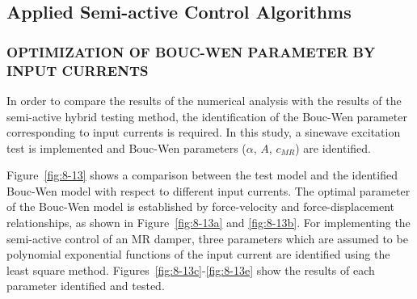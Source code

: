 \subsection{Applied Semi-active Control Algorithms}
\subsubsection{OPTIMIZATION OF BOUC-WEN PARAMETER BY INPUT CURRENTS}

In order to compare the results of the numerical analysis with the results of the semi-active hybrid testing method, the identification of the Bouc-Wen parameter corresponding to input currents is required. In this study, a sinewave excitation test is implemented and Bouc-Wen parameters ($\alpha$, $A$, $c_{MR}$) are identified.

Figure~\ref{fig:8-13} shows a comparison between the test model and the identified Bouc-Wen model with respect to different input currents. The optimal parameter of the Bouc-Wen model is established by force-velocity and force-displacement relationships, as shown in Figure~\ref{fig:8-13a} and \ref{fig:8-13b}. For implementing the semi-active control of an MR damper, three parameters which are assumed to be polynomial exponential functions of the input current are identified using the least square method. Figures~\ref{fig:8-13c}-\ref{fig:8-13e} show the results of each parameter identified and tested.

